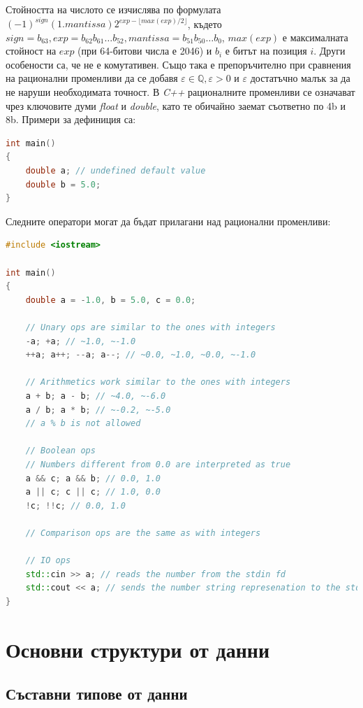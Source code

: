 \documentclass[fleqn,12pt]{article}
\begin{document}
\begin{flushleft}
Стойността на числото се изчислява по формулата $(-1)^{sign} (1.mantissa) 2^{exp - \lfloor max(exp)/2 \rfloor}$, където $sign = b_{63}, exp = b_{62}b_{61} \dots b_{52}, mantissa = b_{51}b_{50} \dots b_{0}$, $max(exp)$ е максималната стойност на $exp$ (при 64-битови числа е 2046) и $b_i$ е битът на позиция $i$.
\bigbreak
Други особености са, че не е комутативен. Също така е препоръчително при сравнения на рационални променливи да се добавя $\varepsilon \in \mathbb{Q}, \varepsilon > 0$ и $\varepsilon$ достатъчно малък за да не наруши необходимата точност.
\bigbreak
В \textit{C++} рационалните променливи се означават чрез ключовите думи \textit{float} и \textit{double}, като те обичайно заемат съответно по 4b и 8b. Примери за дефиниция са:

\begin{lstlisting}[language=C++, caption=Real numbers]
int main()
{
    double a; // undefined default value
    double b = 5.0;
}
\end{lstlisting}

Следните оператори могат да бъдат прилагани над рационални променливи:

\begin{lstlisting}[language=C++, caption=Real number operations]
#include <iostream>

int main()
{
    double a = -1.0, b = 5.0, c = 0.0;

    // Unary ops are similar to the ones with integers
    -a; +a; // ~1.0, ~-1.0
    ++a; a++; --a; a--; // ~0.0, ~1.0, ~0.0, ~-1.0

    // Arithmetics work similar to the ones with integers
    a + b; a - b; // ~4.0, ~-6.0
    a / b; a * b; // ~-0.2, ~-5.0
    // a % b is not allowed

    // Boolean ops
    // Numbers different from 0.0 are interpreted as true
    a && c; a && b; // 0.0, 1.0
    a || c; c || c; // 1.0, 0.0
    !c; !!c; // 0.0, 1.0

    // Comparison ops are the same as with integers

    // IO ops
    std::cin >> a; // reads the number from the stdin fd
    std::cout << a; // sends the number string represenation to the stdout fd
}

\end{lstlisting}

\section{Основни структури от данни}
\subsection{Съставни типове от данни}

\end{flushleft}
\end{document}

